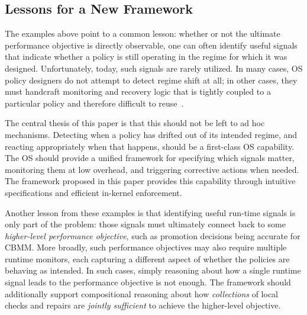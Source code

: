 \subsection{Lessons for a New Framework}\label{subsec:lessons}

The examples above point to a common lesson: whether or not the ultimate performance objective is directly observable, one can often identify useful signals that indicate whether a policy is still operating in the regime for which it was designed. Unfortunately, today, such signals are rarely utilized. In many cases, OS policy designers do not attempt to detect regime shift at all; in other cases, they must handcraft monitoring and recovery logic that is tightly coupled to a particular policy and therefore difficult to reuse~\cite{linnos-osdi20,llama-asplos20,ingens-osdi16,sol-asplos22}.

The central thesis of this paper is that this should not be left to ad hoc mechanisms. Detecting when a policy has drifted out of its intended regime, and reacting appropriately when that happens, should be a first-class OS capability. The OS should provide a unified framework for specifying which signals matter, monitoring them at low overhead, and triggering corrective actions when needed. The framework proposed in this paper provides this capability through intuitive specifications and efficient in-kernel enforcement.

Another lesson from these examples is that identifying useful run-time signals is only part of the problem: those signals must ultimately connect back to some {\em higher-level performance objective}, such as promotion decisions being accurate for CBMM.
More broadly, such performance objectives may also require multiple runtime monitors, each capturing a different aspect of whether the policies are behaving as intended.
In such cases, simply reasoning about how a single runtime signal leads to the performance objective is not enough. The framework should additionally support compositional reasoning about how {\em collections} of local checks and repairs are \emph{jointly sufficient} to achieve the higher-level objective. 



